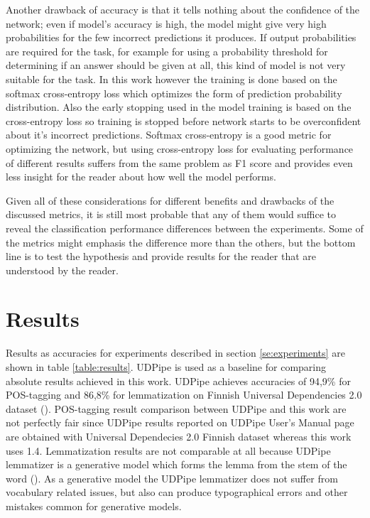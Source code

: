 \documentclass[12pt,a4paper,english
]{tutthesis}
\begin{document}
Another drawback of accuracy is that it tells nothing about the confidence of the network; even if model's accuracy is high, the model might give very high probabilities for the few incorrect predictions it produces. If output probabilities are required for the task, for example for using a probability threshold for determining if an answer should be given at all, this kind of model is not very suitable for the task. In this work however the training is done based on the softmax cross-entropy loss which optimizes the form of prediction probability distribution. Also the early stopping used in the model training is based on the cross-entropy loss so training is stopped before network starts to be overconfident about it's incorrect predictions. Softmax cross-entropy is a good metric for optimizing the network, but using cross-entropy loss for evaluating performance of different results suffers from the same problem as F1 score and provides even less insight for the reader about how well the model performs.

Given all of these considerations for different benefits and drawbacks of the discussed metrics, it is still most probable that any of them would suffice to reveal the classification performance differences between the experiments. Some of the metrics might emphasis the difference more than the others, but the bottom line is to test the hypothesis and provide results for the reader that are understood by the reader.

\section{Results}
\label{se:results}
Results as accuracies for experiments described in section \ref{se:experiments} are shown in table \ref{table:results}. UDPipe is used as a baseline for comparing absolute results achieved in this work. UDPipe achieves accuracies of 94,9\% for POS-tagging and 86,8\% for lemmatization on Finnish Universal Dependencies 2.0 dataset (\cite{udpipe-manual}). POS-tagging result comparison between UDPipe and this work are not perfectly fair since UDPipe results reported on UDPipe User's Manual page are obtained with Universal Dependecies 2.0 Finnish dataset whereas this work uses 1.4. Lemmatization results are not comparable at all because UDPipe lemmatizer is a generative model which forms the lemma from the stem of the word (\cite{Straka2017}). As a generative model the UDPipe lemmatizer does not suffer from vocabulary related issues, but also can produce typographical errors and other mistakes common for generative models.
\end{document}
